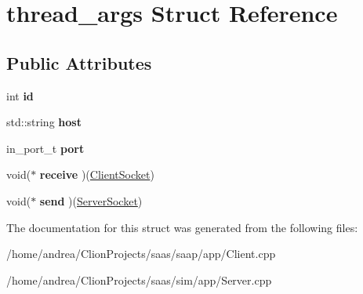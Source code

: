\hypertarget{structthread__args}{}\section{thread\+\_\+args Struct Reference}
\label{structthread__args}
\subsection*{Public Attributes}
\begin{DoxyCompactItemize}
\item 
int {\bfseries id}\hypertarget{structthread__args_a6322b3468fd88f8f49977a6439e9f352}{}\label{structthread__args_a6322b3468fd88f8f49977a6439e9f352}

\item 
std\+::string {\bfseries host}\hypertarget{structthread__args_a2993a11951278a8e5277b45ac9547d00}{}\label{structthread__args_a2993a11951278a8e5277b45ac9547d00}

\item 
in\+\_\+port\+\_\+t {\bfseries port}\hypertarget{structthread__args_aec0f2f19bebb0641a7a635ad70376db3}{}\label{structthread__args_aec0f2f19bebb0641a7a635ad70376db3}

\item 
void($\ast$ {\bfseries receive} )(\hyperlink{class_client_socket}{Client\+Socket})\hypertarget{structthread__args_a44ed1c0214dc37f162e77dbe0f9dd5fb}{}\label{structthread__args_a44ed1c0214dc37f162e77dbe0f9dd5fb}

\item 
void($\ast$ {\bfseries send} )(\hyperlink{class_server_socket}{Server\+Socket})\hypertarget{structthread__args_a32fa5ab6ec80d4ee564930d62027fd93}{}\label{structthread__args_a32fa5ab6ec80d4ee564930d62027fd93}

\end{DoxyCompactItemize}


The documentation for this struct was generated from the following files\+:\begin{DoxyCompactItemize}
\item 
/home/andrea/\+Clion\+Projects/saas/saap/app/Client.\+cpp\item 
/home/andrea/\+Clion\+Projects/saas/sim/app/Server.\+cpp\end{DoxyCompactItemize}
